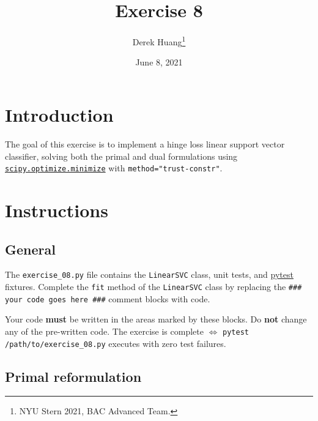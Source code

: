 \documentclass{article}
\title{Exercise 8}
\author{Derek Huang\thanks{NYU Stern 2021, BAC Advanced Team.}}
\date{June 8, 2021}
\numberwithin{equation}{section}
\newcommand{\pytest}{\href{https://docs.pytest.org/en/stable/}{pytest}}
\newcommand{\minimize}{%
    \href{%
        https://docs.scipy.org/doc/scipy/reference/generated/%
        scipy.optimize.minimize.html%
    }{\texttt{scipy.optimize.minimize}}%
}
\begin{document}
\maketitle
\thispagestyle{fancy}


\section{Introduction}

The goal of this exercise is to implement a hinge loss linear support vector classifier, solving both the primal and dual formulations using \minimize{} with \texttt{method="trust-constr"}.

\section{Instructions}

\subsection{General}

The \texttt{exercise\_08.py} file contains the \texttt{LinearSVC} class, unit
tests, and \pytest{} fixtures. Complete the \texttt{fit} method of the 
\texttt{LinearSVC} class by replacing the
\texttt{\#\#\# your code goes here \#\#\#} comment blocks with code.

\medskip

Your code \textbf{must} be written in the areas marked by these blocks. Do
\textbf{not} change any of the pre-written code. The exercise is complete
$ \Leftrightarrow $ \texttt{pytest /path/to/exercise\_08.py} executes with
zero test failures.


\subsection{Primal reformulation}
\end{document}
